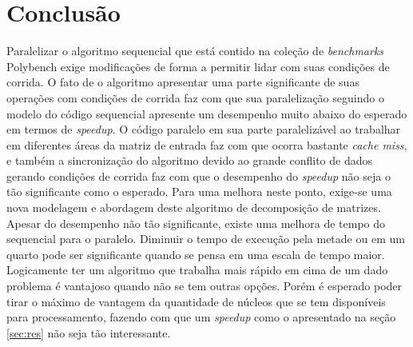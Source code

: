\documentclass[12pt]{article}
\newcommand\tab[1][1cm]{\hspace*{#1}}
\begin{document}
\section{Conclusão}\label{sec:conc}
\tab Paralelizar o algoritmo sequencial que está contido na coleção de \textit{benchmarks} Polybench exige modificações de forma a permitir lidar com suas condições de corrida. O fato de o algoritmo apresentar uma parte significante de suas operações com condições de corrida faz com que sua paralelização seguindo o modelo do código sequencial apresente um desempenho muito abaixo do esperado em termos de \textit{speedup}. O código paralelo em sua parte paralelizável ao trabalhar em diferentes áreas da matriz de entrada faz com que ocorra bastante \textit{cache miss}, e também a sincronização do algoritmo devido ao grande conflito de dados gerando condições de corrida faz com que o desempenho do \textit{speedup} não seja o tão significante como o esperado. Para uma melhora neste ponto, exige-se uma nova modelagem e abordagem deste algoritmo de decomposição de matrizes.
\\
\tab Apesar do desempenho não tão significante, existe uma melhora de tempo do sequencial para o paralelo. Diminuir o tempo de execução pela metade ou em um quarto pode ser significante quando se pensa em uma escala de tempo maior. Logicamente ter um algoritmo que trabalha mais rápido em cima de um dado problema é vantajoso quando não se tem outras opções. Porém é esperado poder tirar o máximo de vantagem da quantidade de núcleos que se tem disponíveis para processamento, fazendo com que um \textit{speedup} como o apresentado na seção \ref{sec:res} não seja tão interessante.



\end{document}
